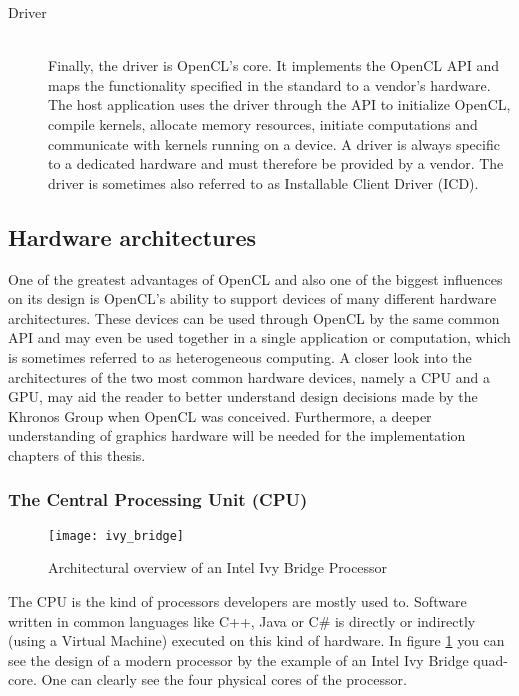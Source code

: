 \begin{description}
	\item[Driver] \hfill \\
	Finally, the driver is OpenCL's core. It implements the OpenCL API and maps the functionality specified in the standard to a vendor's hardware. The host application uses the driver through the API to initialize OpenCL, compile kernels, allocate memory resources, initiate computations and communicate with kernels running on a device. A driver is always specific to a dedicated hardware and must therefore be provided by a vendor. The driver is sometimes also referred to as Installable Client Driver (ICD).
\end{description}

\subsection{Hardware architectures}

One of the greatest advantages of OpenCL and also one of the biggest influences on its design is OpenCL's ability to support devices of many different hardware architectures. These devices can be used through OpenCL by the same common API and may even be used together in a single application or computation, which is sometimes referred to as heterogeneous computing.
A closer look into the architectures of the two most common hardware devices, namely a CPU and a GPU, may aid the reader to better understand design decisions made by the Khronos Group when OpenCL was conceived. Furthermore, a deeper understanding of graphics hardware will be needed for the implementation chapters of this thesis.

\subsubsection{The Central Processing Unit (CPU)}

\begin{figure} %
\centering
\texttt{[image: ivy\_bridge]}
\caption{Architectural overview of an Intel Ivy Bridge Processor \cite{}}
\label{fig:ivy_bridge}
\end{figure}

The CPU is the kind of processors developers are mostly used to. Software written in common languages like C++, Java or C# is directly or indirectly (using a Virtual Machine) executed on this kind of hardware.
In figure \ref{fig:ivy_bridge} you can see the design of a modern processor by the example of an Intel Ivy Bridge quad-core. One can clearly see the four physical cores of the processor. 


